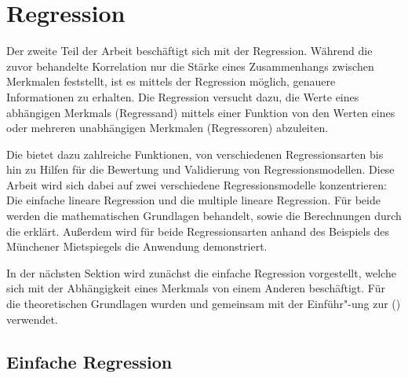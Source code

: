 \section{Regression}

Der zweite Teil der Arbeit beschäftigt sich mit der Regression.
Während die zuvor behandelte Korrelation nur die Stärke eines Zusammenhangs zwischen Merkmalen feststellt, ist es mittels der Regression möglich, genauere Informationen zu erhalten.
Die Regression versucht dazu, die Werte eines abhängigen Merkmals (Regressand) mittels einer Funktion von den Werten eines oder mehreren unabhängigen Merkmalen (Regressoren) abzuleiten.

Die \naglib bietet dazu zahlreiche Funktionen, von verschiedenen Regressionsarten bis hin zu Hilfen für die Bewertung und Validierung von Regressionsmodellen.
Diese Arbeit wird sich dabei auf zwei verschiedene Regressionsmodelle konzentrieren:
Die einfache lineare Regression und die multiple lineare Regression.
Für beide werden die mathematischen Grundlagen behandelt, sowie die Berechnungen durch die \naglib erklärt. 
Außerdem wird für beide Regressionsarten anhand des Beispiels des Münchener Mietspiegels die Anwendung demonstriert.

In der nächsten Sektion wird zunächst die einfache Regression vorgestellt, welche sich mit der Abhängigkeit eines Merkmals von einem Anderen beschäftigt.
Für die theoretischen Grundlagen wurden \cite{Cramer2007} und \cite{Fahrmeir2010} gemeinsam mit der Einführ"-ung zur \naglib (\cite{nag:intro}) verwendet.

\subsection{Einfache Regression}
\label{sec:sim_reg}

